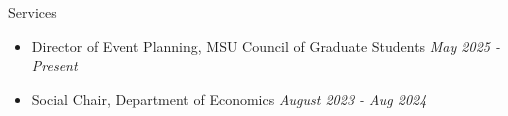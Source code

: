 \documentclass{resume} %
\begin{document}
\begin{rSection}{Services}
\begin{itemize}
    \item Director of Event Planning, MSU Council of Graduate Students \hfill {\em May 2025 - Present}
    \item Social Chair, Department of Economics \hfill {\em August 2023 - Aug 2024}
\end{itemize}
\end{rSection}




\end{document}
